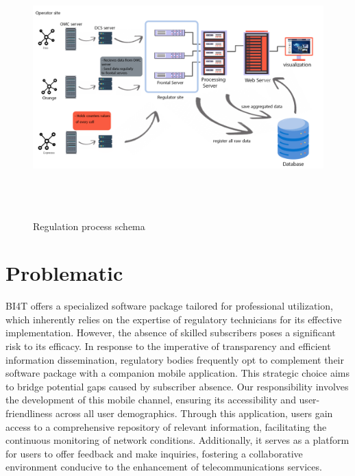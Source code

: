 \begin{figure}[H]
    \centering
    \includegraphics[height=10cm]{images/chap1/archi_1.png}
    \caption{Regulation process schema}
    \label{fig:enter-label}
\end{figure}






\section{Problematic}
BI4T offers a specialized software package tailored for professional utilization, which inherently relies on the expertise of regulatory technicians for its effective implementation. However, the absence of skilled subscribers poses a significant risk to its efficacy. In response to the imperative of transparency and efficient information dissemination, regulatory bodies frequently opt to complement their software package with a companion mobile application. This strategic choice aims to bridge potential gaps caused by subscriber absence. Our responsibility involves the development of this mobile channel, ensuring its accessibility and user-friendliness across all user demographics. Through this application, users gain access to a comprehensive repository of relevant information, facilitating the continuous monitoring of network conditions. Additionally, it serves as a platform for users to offer feedback and make inquiries, fostering a collaborative environment conducive to the enhancement of telecommunications services.


\newpage
